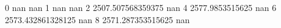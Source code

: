 0 nan nan
1 nan nan
2 2507.507568359375 nan
4 2577.9853515625 nan
6 2573.432861328125 nan
8 2571.287353515625 nan
